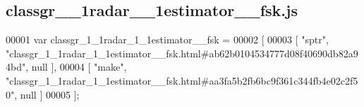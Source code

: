 \subsection{classgr\+\_\+\_\+1radar\+\_\+\_\+1estimator\+\_\+\+\_\+fsk.\+js}
\label{classgr__1__1radar__1__1estimator____fsk_8js_source}

\begin{DoxyCode}
00001 var classgr_1_1radar_1_1estimator__fsk =
00002 [
00003     [ \textcolor{stringliteral}{"sptr"}, \textcolor{stringliteral}{"classgr\_1\_1radar\_1\_1estimator\_\_fsk.html#ab62b0104534777d08f40690db82a94bd"}, null ],
00004     [ \textcolor{stringliteral}{"make"}, \textcolor{stringliteral}{"classgr\_1\_1radar\_1\_1estimator\_\_fsk.html#aa3fa5b2fb6bc9f361c344fb4e02c2f50"}, null ]
00005 ];
\end{DoxyCode}
